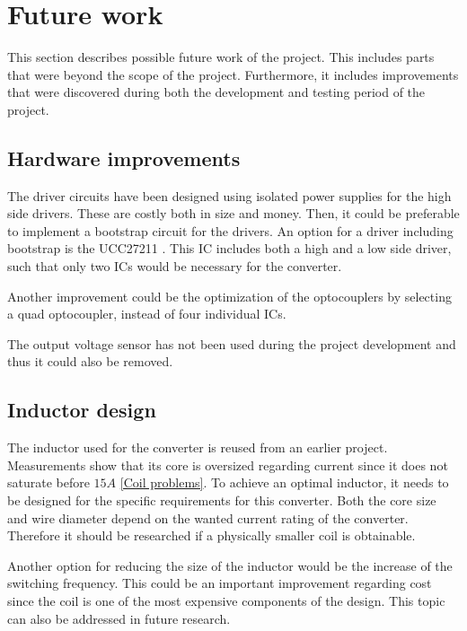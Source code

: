 \section{Future work}
This section describes possible future work of the project. This includes parts that were beyond the scope of the project. Furthermore, it includes improvements that were discovered during both the development and testing period of the project.


\subsection{Hardware improvements}
The driver circuits have been designed using isolated power supplies for the high side drivers. These are costly both in size and money. Then, it could be preferable to implement a bootstrap circuit for the drivers. An option for a driver including bootstrap is the UCC27211 \cite{boot_driver_datasheet}. This IC includes both a high and a low side driver, such that only two ICs would be necessary for the converter. 

Another improvement could be the optimization of the optocouplers by selecting a quad optocoupler, instead of four individual ICs. 

The output voltage sensor has not been used during the project development and thus it could also be removed.
 

\subsection{Inductor design}
The inductor used for the converter is reused from an earlier project. Measurements show that its core is oversized regarding current since it does not saturate before $15A$ \ref{Coil problems}. To achieve an optimal inductor, it needs to be designed for the specific requirements for this converter. Both the core size and wire diameter depend on the wanted current rating of the converter\cite{underthehood}. Therefore it should be researched if a physically smaller coil is obtainable.

Another option for reducing the size of the inductor would be the increase of the switching frequency. This could be an important improvement regarding cost since the coil is one of the most expensive components of the design. This topic can also be addressed in future research.


